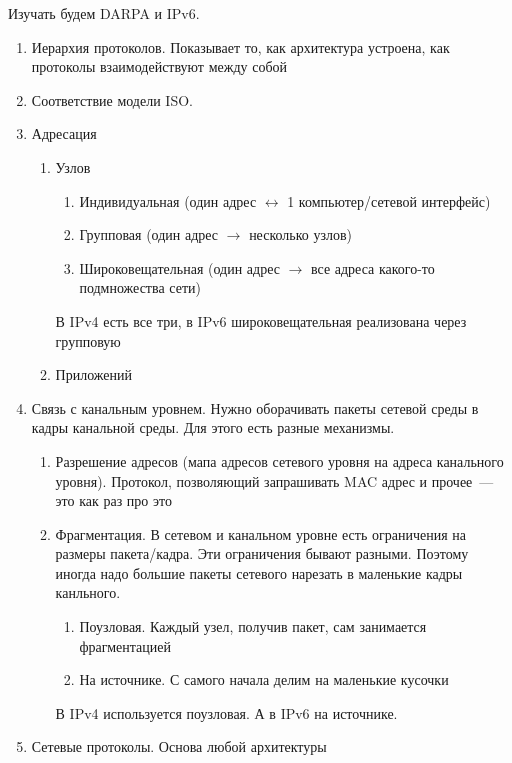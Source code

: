 Изучать будем DARPA и IPv6. 


\begin{enumerate}
    \item Иерархия протоколов. Показывает то, как архитектура устроена, как протоколы взаимодействуют между собой
    \item Соответствие модели ISO. 
    \item Адресация
    \begin{enumerate}
        \item Узлов
        \begin{enumerate}
            \item Индивидуальная (один адрес $\leftrightarrow$ 1 компьютер/сетевой интерфейс)
            \item Групповая (один адрес $\rightarrow$ несколько узлов)
            \item Широковещательная (один адрес $\rightarrow$ все адреса какого-то подмножества сети)
        \end{enumerate}
        В IPv4 есть все три, в IPv6 широковещательная реализована через групповую
        \item Приложений
    \end{enumerate}
    \item Связь с канальным уровнем. Нужно оборачивать пакеты сетевой среды в кадры канальной среды. Для этого есть разные механизмы.
    \begin{enumerate}
        \item Разрешение адресов (мапа адресов сетевого уровня на адреса канального уровня). Протокол, позволяющий запрашивать MAC адрес и прочее~--- это как раз про это
        \item Фрагментация. В сетевом и канальном уровне есть ограничения на размеры пакета/кадра. Эти ограничения бывают разными. Поэтому иногда надо большие пакеты сетевого нарезать в маленькие кадры канльного.
        \begin{enumerate}
            \item Поузловая. Каждый узел, получив пакет, сам занимается фрагментацией
            \item На источнике. С самого начала делим на маленькие кусочки
        \end{enumerate}
        В IPv4 используется поузловая. А в IPv6 на источнике.  
    \end{enumerate}
    \item Сетевые протоколы. Основа любой архитектуры

\end{enumerate}
